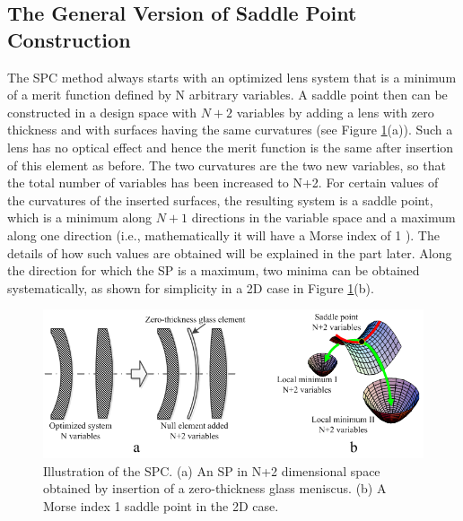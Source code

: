 \subsection{The General Version of Saddle Point Construction \label{spc-general}}
\label{SPC_general}
The SPC method always starts with an optimized lens system that is a minimum of a merit function defined by N arbitrary variables. A saddle point then can be constructed in a design space with $N + 2$ variables by adding a lens with zero thickness and with surfaces having the same curvatures (see Figure \ref{fig:SPCdemo}(a)). Such a lens has no optical effect and hence the merit function is the same after insertion of this element as before. The two curvatures are the two new variables, so that the total number of variables has been increased to N+2. For certain values of the curvatures of the inserted surfaces, the resulting system is a saddle point, which is a minimum along $N + 1$ directions in the variable space and a maximum along one direction (i.e., mathematically it will have a Morse index of 1 \cite{MVTurnhoutSPC15}). The details of how such values are obtained will be explained in the part later. Along the direction for which the SP is a maximum, two minima can be obtained systematically, as shown for simplicity in a 2D case in Figure \ref{fig:SPCdemo}(b).

\begin{figure}[h!]
    \centering
    \includegraphics[scale=0.68]{chapter-2/figures/FigSPCDemo.png}
    \caption{Illustration of the SPC. (a) An SP in N+2 dimensional space obtained by insertion of a zero-thickness glass meniscus. (b) A Morse index 1 saddle point in the 2D case.}
    \label{fig:SPCdemo}
\end{figure}

